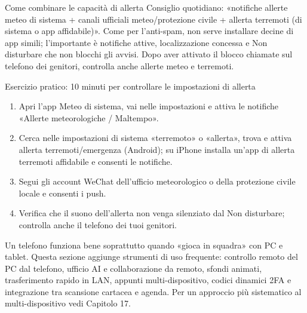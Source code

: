 \begin{tcbinfo}{Come combinare le capacità di allerta}
Consiglio quotidiano: «notifiche allerte meteo di sistema + canali ufficiali meteo/protezione civile + allerta terremoti (di sistema o app affidabile)». Come per l'anti-spam, non serve installare decine di app simili; l'importante è notifiche attive, localizzazione concessa e Non disturbare che non blocchi gli avvisi. Dopo aver attivato il blocco chiamate sul telefono dei genitori, controlla anche allerte meteo e terremoti.

\end{tcbinfo}

\begin{tcbpractice}{Esercizio pratico: 10 minuti per controllare le impostazioni di allerta}
\begin{enumerate}
  \item Apri l'app Meteo di sistema, vai nelle impostazioni e attiva le notifiche «Allerte meteorologiche / Maltempo».
  \item Cerca nelle impostazioni di sistema «terremoto» o «allerta», trova e attiva allerta terremoti/emergenza (Android); su iPhone installa un'app di allerta terremoti affidabile e consenti le notifiche.
  \item Segui gli account WeChat dell'ufficio meteorologico o della protezione civile locale e consenti i push.
  \item Verifica che il suono dell'allerta non venga silenziato dal Non disturbare; controlla anche il telefono dei tuoi genitori.
\end{enumerate}

\end{tcbpractice}


Un telefono funziona bene soprattutto quando «gioca in squadra» con PC e tablet. Questa sezione aggiunge strumenti di uso frequente: controllo remoto del PC dal telefono, ufficio AI e collaborazione da remoto, sfondi animati, trasferimento rapido in LAN, appunti multi-dispositivo, codici dinamici 2FA e integrazione tra scansione cartacea e agenda. Per un approccio più sistematico al multi-dispositivo vedi Capitolo 17.


